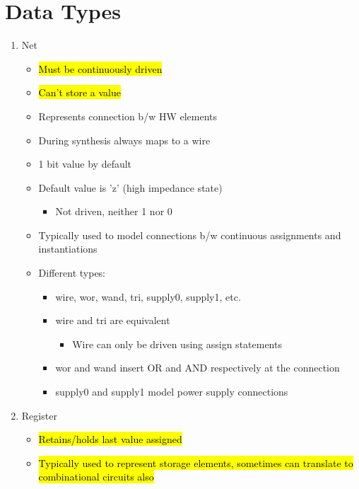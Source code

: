 \documentclass[11pt,twoside,a4paper,titlepage]{article}
\begin{document}
\section{Data Types}
\begin{enumerate}
    \item Net
        \begin{itemize}
            \item \hl{Must be continuously driven}
            \item \hl{Can't store a value}
            \item Represents connection b/w HW elements
            \item During synthesis always maps to a wire
            \item 1 bit value by default
            \item Default value is 'z' (high impedance state)
                \begin{itemize}
                    \item Not driven, neither 1 nor 0
                \end{itemize}
            \item Typically used to model connections b/w continuous assignments and instantiations 
            \item Different types:
                \begin{itemize}
                    \item wire, wor, wand, tri, supply0, supply1, etc.
                    \item wire and tri are equivalent
                        \begin{itemize}
                            \item Wire can only be driven using assign statements
                        \end{itemize}
                    \item wor and wand insert OR and AND respectively at the connection
                    \item supply0 and supply1 model power supply connections
                \end{itemize}
        \end{itemize}
    \item Register
        \begin{itemize}
            \item \hl{Retains/holds last value assigned}
            \item \hl{Typically used to represent storage elements, sometimes can translate to combinational circuits also}

\end{itemize}
\end{enumerate}
\end{document}
